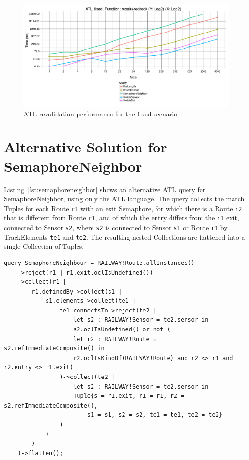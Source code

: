 \documentclass[submission,copyright,creativecommons]{eptcs}
\begin{document}
\begin{figure}[ht]
\centerline{
\includegraphics[width=15cm]{figures/fixed-ATL-GroupBy-Query-time-revalidation}}
\caption{ATL revalidation performance for the fixed scenario}
\label{fig:atl-recheck-performance}
\end{figure}


\appendix

\section{Alternative Solution for SemaphoreNeighbor}
\label{appendix:a}

Listing~\ref{lst:semaphoreneighbor} shows an alternative ATL query for SemaphoreNeighbor, using only the ATL language. The query collects the match Tuples for each Route \texttt{r1} with an exit Semaphore, for which there is a Route \texttt{r2} that is different from Route \texttt{r1}, and of which the entry differs from the \texttt{r1} exit, connected to Sensor \texttt{s2}, where \texttt{s2} is connected to Sensor \texttt{s1} or Route \texttt{r1} by TrackElements \texttt{te1} and \texttt{te2}. The resulting nested Collections are flattened into a single Collection of Tuples.

\lstset{language=atl}
\begin{lstlisting}[float=htb, caption={SemaphoreNeighbor query in ATL}, label=lst:semaphoreneighbor, captionpos=b, frame=tb, belowskip=-10pt]
query SemaphoreNeighbour = RAILWAY!Route.allInstances()
	->reject(r1 | r1.exit.oclIsUndefined())
	->collect(r1 | 
		r1.definedBy->collect(s1 | 
			s1.elements->collect(te1 | 
				te1.connectsTo->reject(te2 | 
					let s2 : RAILWAY!Sensor = te2.sensor in
					s2.oclIsUndefined() or not (
					let r2 : RAILWAY!Route = s2.refImmediateComposite() in
					r2.oclIsKindOf(RAILWAY!Route) and r2 <> r1 and r2.entry <> r1.exit)
				)->collect(te2 |
					let s2 : RAILWAY!Sensor = te2.sensor in
					Tuple{s = r1.exit, r1 = r1, r2 = s2.refImmediateComposite(), 
						s1 = s1, s2 = s2, te1 = te1, te2 = te2}
				)
			)
		)
	)->flatten();
\end{lstlisting}
\end{document}
